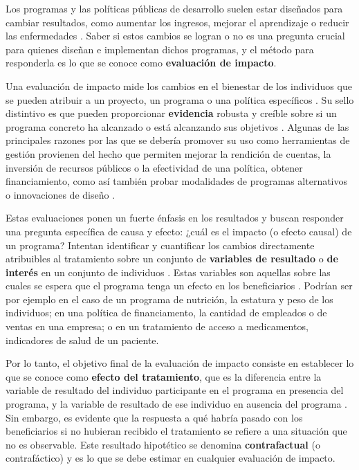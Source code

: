 \documentclass[../../main.tex]{subfiles}
\begin{document}
Los programas y las políticas públicas de desarrollo suelen estar diseñados para cambiar
resultados, como aumentar los ingresos, mejorar el aprendizaje o reducir las enfermedades
\cite{gertler-2016}. Saber si estos cambios se logran o no es una pregunta crucial para
quienes diseñan e implementan dichos programas, y el método para responderla es lo que se
conoce como \textbf{evaluación de impacto}.

Una evaluación de impacto mide los cambios en el bienestar de los individuos que se pueden
atribuir a un proyecto, un programa o una política específicos \cite{gertler-2016}. Su
sello distintivo es que pueden proporcionar \textbf{evidencia} robusta y creíble sobre si
un programa concreto ha alcanzado o está alcanzando sus objetivos \cite{gertler-2016}.
Algunas de las principales razones por las que se debería promover su uso como
herramientas de gestión provienen del hecho que permiten mejorar la rendición de cuentas,
la inversión de recursos públicos o la efectividad de una política, obtener
financiamiento, como así también probar modalidades de programas alternativos o
innovaciones de diseño \cite{gertler-2016}.

Estas evaluaciones ponen un fuerte énfasis en los resultados y buscan responder una
pregunta específica de causa y efecto: ¿cuál es el impacto (o efecto causal) de un
programa? Intentan identificar y cuantificar los cambios directamente atribuibles al
tratamiento \cite{gertler-2016} sobre un conjunto de \textbf{variables de resultado} o
\textbf{de interés} en un conjunto de individuos \cite{bernal}. Estas variables son
aquellas sobre las cuales se espera que el programa tenga un efecto en los beneficiarios
\cite{bernal}. Podrían ser por ejemplo en el caso de un programa de nutrición, la estatura
y peso de los individuos; en una política de financiamento, la cantidad de empleados o de
ventas en una empresa; o en un tratamiento de acceso a medicamentos, indicadores de salud
de un paciente.

Por lo tanto, el objetivo final de la evaluación de impacto consiste en establecer lo que
se conoce como \textbf{efecto del tratamiento}, que es la diferencia entre la variable de
resultado del individuo participante en el programa en presencia del programa, y la
variable de resultado de ese individuo en ausencia del programa \cite{bernal}. Sin
embargo, es evidente que la respuesta a qué habría pasado con los beneficiarios si no
hubieran recibido el tratamiento se refiere a una situación que no es observable. Este
resultado hipotético se denomina \textbf{contrafactual} (o contrafáctico) y es lo que se
debe estimar en cualquier evaluación de impacto.
\end{document}
